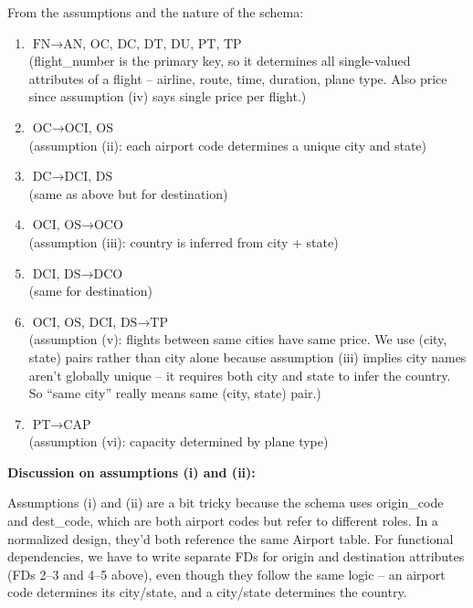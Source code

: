\documentclass[11pt]{article}
\begin{document}
\medskip
\noindent From the assumptions and the nature of the schema:

\begin{enumerate}
  \item $\text{FN} \to \text{AN, OC, DC, DT, DU, PT, TP}$ \\
  (flight\_number is the primary key, so it determines all single-valued attributes of a flight -- airline, route, time, duration, plane type. Also price since assumption (iv) says single price per flight.)

  \item $\text{OC} \to \text{OCI, OS}$ \\
  (assumption (ii): each airport code determines a unique city and state)

  \item $\text{DC} \to \text{DCI, DS}$ \\
  (same as above but for destination)

  \item $\text{OCI, OS} \to \text{OCO}$ \\
  (assumption (iii): country is inferred from city + state)

  \item $\text{DCI, DS} \to \text{DCO}$ \\
  (same for destination)

  \item $\text{OCI, OS, DCI, DS} \to \text{TP}$ \\
  (assumption (v): flights between same cities have same price. We use (city, state) pairs rather than city alone because assumption (iii) implies city names aren't globally unique -- it requires both city and state to infer the country. So ``same city'' really means same (city, state) pair.)

  \item $\text{PT} \to \text{CAP}$ \\
  (assumption (vi): capacity determined by plane type)
\end{enumerate}

\medskip
\noindent\textbf{Discussion on assumptions (i) and (ii):}

Assumptions (i) and (ii) are a bit tricky because the schema uses origin\_code and dest\_code, which are both airport codes but refer to different roles. In a normalized design, they'd both reference the same Airport table. For functional dependencies, we have to write separate FDs for origin and destination attributes (FDs 2--3 and 4--5 above), even though they follow the same logic -- an airport code determines its city/state, and a city/state determines the country.
\end{document}
